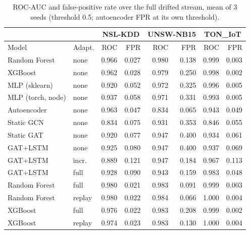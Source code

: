 \documentclass[twocolumn]{llncs}
\begin{document}
\begin{table}[!t]
\centering
\caption{ROC-AUC and false-positive rate over the full drifted stream, mean of 3 seeds (threshold
0.5; autoencoder FPR at its own threshold).}
\label{tab:multi-aucfpr}
\small
\setlength{\tabcolsep}{4pt}
\begin{tabular}{|l|l|r|r|r|r|r|r|}
\hline
 & & \multicolumn{2}{|c|}{NSL-KDD} & \multicolumn{2}{|c|}{UNSW-NB15} & \multicolumn{2}{|c|}{TON\_IoT} \\
\hline
Model & Adapt. & ROC & FPR & ROC & FPR & ROC & FPR \\
\hline
Random Forest      & none & 0.966 & 0.027 & 0.980 & 0.138 & 0.999 & 0.003 \\
XGBoost            & none & 0.962 & 0.028 & 0.979 & 0.250 & 0.998 & 0.002 \\
MLP (sklearn)      & none & 0.920 & 0.052 & 0.972 & 0.325 & 0.996 & 0.005 \\
MLP (torch, node)  & none & 0.937 & 0.058 & 0.971 & 0.331 & 0.993 & 0.005 \\
Autoencoder        & none & 0.963 & 0.047 & 0.834 & 0.065 & 0.943 & 0.049 \\
Static GCN         & none & 0.834 & 0.075 & 0.931 & 0.353 & 0.846 & 0.055 \\
Static GAT         & none & 0.920 & 0.077 & 0.947 & 0.400 & 0.934 & 0.061 \\
GAT+LSTM           & none & 0.925 & 0.080 & 0.947 & 0.400 & 0.937 & 0.069 \\
GAT+LSTM           & incr.& 0.889 & 0.121 & 0.947 & 0.184 & 0.967 & 0.113 \\
GAT+LSTM           & full & 0.928 & 0.090 & 0.943 & 0.159 & 0.983 & 0.048 \\
\hline
Random Forest      & full & 0.980 & 0.021 & 0.983 & 0.091 & 0.999 & 0.003 \\
Random Forest      & replay & 0.980 & 0.022 & 0.984 & 0.066 & 1.000 & 0.004 \\
XGBoost            & full & 0.976 & 0.022 & 0.983 & 0.208 & 0.999 & 0.002 \\
XGBoost            & replay & 0.974 & 0.023 & 0.983 & 0.130 & 1.000 & 0.004 \\
\hline
\end{tabular}
\end{table}
\end{document}
